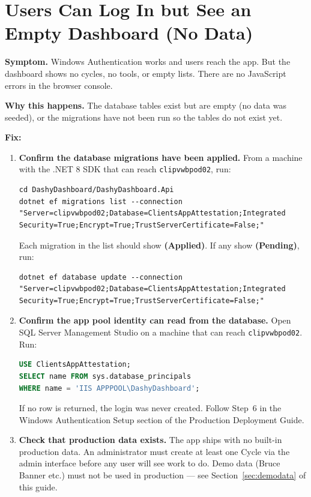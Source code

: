 \documentclass[a4paper,11pt]{article}
\begin{document}
\section{Users Can Log In but See an Empty Dashboard (No Data)}
\label{sec:nodata}

\textbf{Symptom.}
Windows Authentication works and users reach the app.
But the dashboard shows no cycles, no tools, or empty lists.
There are no JavaScript errors in the browser console.

\textbf{Why this happens.}
The database tables exist but are empty (no data was seeded),
or the migrations have not been run so the tables do not exist yet.

\textbf{Fix:}

\begin{enumerate}
  \item \textbf{Confirm the database migrations have been applied.}
        From a machine with the .NET 8 SDK that can reach \texttt{clipvwbpod02}, run:
\begin{lstlisting}
cd DashyDashboard/DashyDashboard.Api
dotnet ef migrations list --connection "Server=clipvwbpod02;Database=ClientsAppAttestation;Integrated Security=True;Encrypt=True;TrustServerCertificate=False;"
\end{lstlisting}
        Each migration in the list should show \textbf{(Applied)}.
        If any show \textbf{(Pending)}, run:
\begin{lstlisting}
dotnet ef database update --connection "Server=clipvwbpod02;Database=ClientsAppAttestation;Integrated Security=True;Encrypt=True;TrustServerCertificate=False;"
\end{lstlisting}
  \item \textbf{Confirm the app pool identity can read from the database.}
        Open SQL Server Management Studio on a machine that can reach \texttt{clipvwbpod02}.
        Run:
\begin{lstlisting}[language=SQL]
USE ClientsAppAttestation;
SELECT name FROM sys.database_principals
WHERE name = 'IIS APPPOOL\DashyDashboard';
\end{lstlisting}
        If no row is returned, the login was never created.
        Follow Step~6 in the Windows Authentication Setup section of the
        Production Deployment Guide.
  \item \textbf{Check that production data exists.}
        The app ships with no built-in production data.
        An administrator must create at least one Cycle via the admin interface
        before any user will see work to do.
        Demo data (Bruce Banner etc.) must not be used in production
        --- see Section~\ref{sec:demodata} of this guide.
\end{enumerate}
\end{document}
